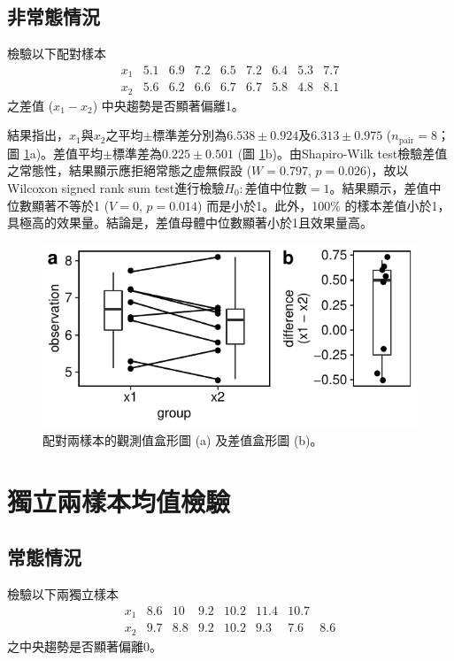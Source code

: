 \documentclass[12pt, a4paper, onecolumn]{article}
\begin{document}
\subsection{非常態情況}
檢驗以下配對樣本
\[
\begin{matrix}
x_1 & 5.1 & 6.9 & 7.2 & 6.5 & 7.2 & 6.4 & 5.3 & 7.7 \\
x_2 & 5.6 & 6.2 & 6.6 & 6.7 & 6.7 & 5.8 & 4.8 & 8.1
\end{matrix}
\]
之差值 ($x_1 - x_2$) 中央趨勢是否顯著偏離1。

結果指出，$x_1$與$x_2$之平均$\pm$標準差分別為$6.538 \pm 0.924$及$6.313 \pm 0.975$ ($n_\mathrm{pair} = 8$；圖 \ref{fig:non-normal_paired_test}a)。差值平均$\pm$標準差為$0.225\pm0.501$ (圖 \ref{fig:non-normal_paired_test}b)。由Shapiro-Wilk test檢驗差值之常態性，結果顯示應拒絕常態之虚無假設 ($W = 0.797$, $p = 0.026$)，故以Wilcoxon signed rank sum test進行檢驗$H_0: \text{差值中位數}=1$。結果顯示，差值中位數顯著不等於1 ($V = 0$, $p = 0.014$) 而是小於1。此外，100\% 的樣本差值小於1，具極高的效果量。結論是，差值母體中位數顯著小於1且效果量高。

\begin{figure}
	\centering
	\includegraphics[]{non-normal_paired_test.pdf}
	\caption{配對兩樣本的觀測值盒形圖 (a) 及差值盒形圖 (b)。}
	\label{fig:non-normal_paired_test}
\end{figure}

\section{獨立兩樣本均值檢驗}
\subsection{常態情況}
檢驗以下兩獨立樣本
\[
\begin{matrix}
x_1 & 8.6 & 10 & 9.2 & 10.2 & 11.4 & 10.7 & \\
x_2 & 9.7 & 8.8 & 9.2 & 10.2 & 9.3 & 7.6 & 8.6
\end{matrix}
\]
之中央趨勢是否顯著偏離0。
\end{document}
